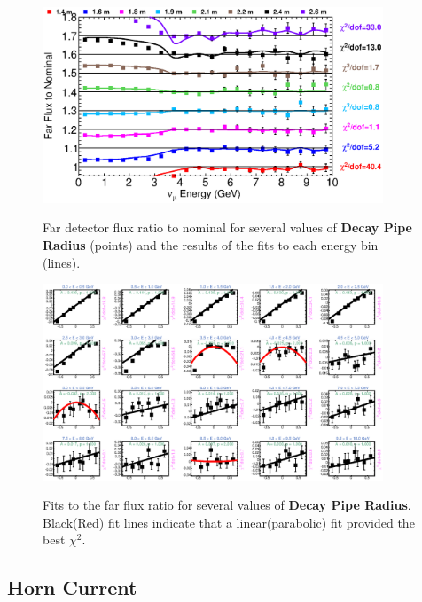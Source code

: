 \begin{figure}[ht]
  \begin{center}
    {\includegraphics[width=4.0in]{figures/DecayPipeRadius_far_summary.eps}}
  \end{center}
\caption{ Far detector flux ratio to nominal for several values of {\bf Decay Pipe Radius} (points) and the results of the fits to each energy bin (lines).}
\end{figure}

\begin{figure}[hb]
  \begin{center}
    {\includegraphics[width=4.0in]{figures/DecayPipeRadius_far_fits.eps}}
  \end{center}
\caption{ Fits to the far flux ratio for several values of {\bf Decay Pipe Radius}. Black(Red) fit lines indicate that a linear(parabolic) fit provided the best $\chi^2$. }
\end{figure}

\clearpage
\subsection{Horn Current}

